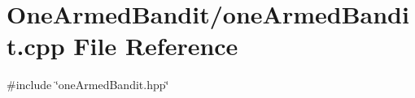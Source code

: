 \section{One\+Armed\+Bandit/one\+Armed\+Bandit.cpp File Reference}
\label{one_armed_bandit_8cpp}
{\ttfamily \#include \char`\"{}one\+Armed\+Bandit.\+hpp\char`\"{}}\newline
